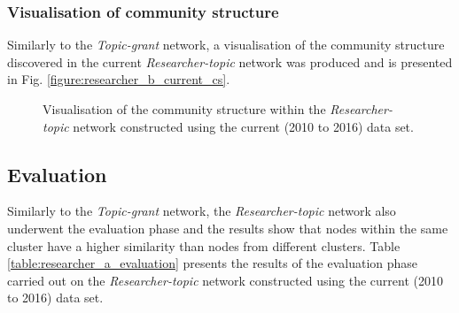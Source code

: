 \subsubsection{Visualisation of community structure}

Similarly to the \textit{Topic-grant} network, a visualisation of the community structure discovered in the current \textit{Researcher-topic} network was produced and is presented in Fig. \ref{figure:researcher_b_current_cs}.

\begin{figure}[!htpb]
    \centering
    \caption[Visualisation of the community structure within the \textit{Researcher-topic} network]{Visualisation of the community structure within the \textit{Researcher-topic} network constructed using the current (2010 to 2016) data set.}
    \label{fig:researcher_a_current_cs}
\end{figure}

\subsection{Evaluation}

Similarly to the \textit{Topic-grant} network, the \textit{Researcher-topic} network also underwent the evaluation phase and the results show that nodes within the same cluster have a higher similarity than nodes from different clusters. Table \ref{table:researcher_a_evaluation} presents the results of the evaluation phase carried out on the \textit{Researcher-topic} network constructed using the current (2010 to 2016) data set.

